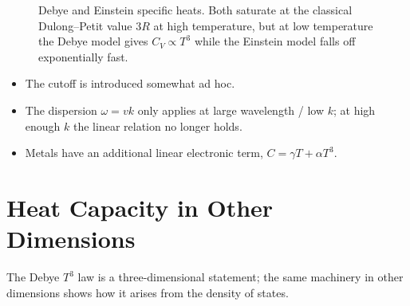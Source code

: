 \begin{figure}[ht]
\centering
{}
\caption{Debye and Einstein specific heats. Both saturate at the classical Dulong--Petit value $3R$ at high temperature, but at low temperature the Debye model gives $C_V \propto T^3$ while the Einstein model falls off exponentially fast.}
\label{fig:phon-cv}
\end{figure}

\begin{fact}
\begin{itemize}
    \item The cutoff is introduced somewhat ad hoc.
    \item The dispersion $\omega = vk$ only applies at large wavelength / low $k$; at high enough $k$ the linear relation no longer holds.
    \item Metals have an additional linear electronic term, $C = \gamma T + \alpha T^3$.
\end{itemize}
\end{fact}

\section{Heat Capacity in Other Dimensions}

The Debye $T^3$ law is a three-dimensional statement; the same machinery in other dimensions shows how it arises from the density of states.

